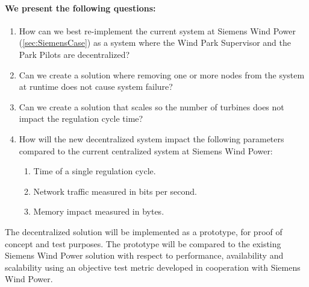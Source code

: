 \paragraph{We present the following questions:}
\begin{enumerate} [label={\arabic*.}, ref=\textit{\arabic*}]
	\item \label{PS:Q:CanWeDoIt} How can we best re-implement the current system at Siemens Wind Power (\cref{sec:SiemensCase}) as a system where the Wind Park Supervisor and the Park Pilots are decentralized?
	\item \label{PS:Q:Availlability} Can we create a solution where removing one or more nodes from the system at runtime does not cause system failure?
	\item \label{PS:Q:CanWeScale} Can we create a solution that scales so the number of turbines does not impact the regulation cycle time?
	\item \label{PS:Q:HowWellDoWeScale} How will the new decentralized system impact the following parameters compared to the current centralized system at Siemens Wind Power:
	\begin{enumerate}
		\item Time of a single regulation cycle.
		\item Network traffic measured in bits per second.
		\item Memory impact measured in bytes.
	\end{enumerate}
\end{enumerate}

The decentralized solution will be implemented as a prototype, for proof of concept and test purposes. The prototype will be compared to the existing Siemens Wind Power solution with respect to performance, availability and scalability using an objective test metric developed in cooperation with Siemens Wind Power.



